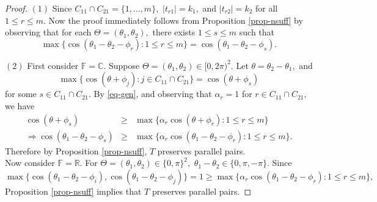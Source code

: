 \documentclass{amsart}
\theoremstyle{definition}
\theoremstyle{remark}
\numberwithin{equation}{section}
\begin{document}
\begin{proof}
$(1)$ Since $C_{11}\cap C_{21}=\{1,\ldots,m\},$ $|t_{r1}|=k_1,$ and $|t_{r2}|=k_2$ for all $1\leq r\leq m.$ Now the proof immediately follows from Proposition \ref{prop-nsuff} by observing that for each $\Theta=(\theta_1,\theta_2),$ there exists $1\leq s\leq m$ such that $$\max\{\cos(\theta_1-\theta_2-\phi_{r}):1\leq r\leq m\}=\cos(\theta_1-\theta_2-\phi_{s}).$$ 	

$(2)$ First consider $\mathbb{F}=\mathbb{C}.$  Suppose $\Theta=(\theta_1,\theta_2)\in[0,2\pi)^2.$ %
Let $\theta=\theta_2-\theta_1,$ and  $$\max\{\cos(\theta+\phi_j):j\in C_{11}\cap C_{21}\}=\cos(\theta+\phi_s)$$ for some $s\in C_{11}\cap C_{21}.$ By \eqref{eq-gen}, and observing that $\alpha_r=1$ for $r\in C_{11}\cap C_{21},$ we have
\begin{eqnarray*}
\cos(\theta+\phi_s)&\geq& \max\Big\{\alpha_r\cos(\theta+\phi_r):1\leq r\leq m \Big\}\\
\Rightarrow \cos(\theta_1-\theta_2-\phi_s)&\geq& \max\Big\{\alpha_r\cos(\theta_1-\theta_2-\phi_r):1\leq r\leq m \Big\}.
\end{eqnarray*}
Therefore by Proposition \ref{prop-nsuff}, $T$ preserves parallel pairs.\\
Now consider $\mathbb{F}=\mathbb{R}.$ For $\Theta=(\theta_1,\theta_2)\in\{0,\pi\}^2,$ $\theta_1-\theta_2\in \{0,\pi,-\pi\}.$ Since $$\max\{\cos(\theta_1-\theta_2-\phi_i), \cos(\theta_1-\theta_2-\phi_j)\}=1\geq \max\Big\{\alpha_r\cos(\theta_1-\theta_2-\phi_r):1\leq r\leq m \Big\},$$
Proposition \ref{prop-nsuff} implies that $T$ preserves parallel pairs.
\end{proof}
\end{document}
